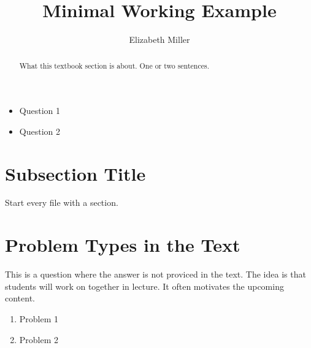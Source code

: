 \documentclass[nooutcomes]{ximera}
\author{Elizabeth Miller}
\title{Minimal Working Example}
\begin{document}
\begin{abstract}
  What this textbook section is about.  One or two sentences.
\end{abstract}
\maketitle



\begin{motivatingQuestions}\begin{itemize}
\item Question 1
\item Question 2
\end{itemize}\end{motivatingQuestions}






\section{Subsection Title}
Start every file with a section.


\section{Problem Types in the Text}

\begin{exploration}
This is a question where the answer is not proviced in the text.  The idea is that students will work on together in lecture.  It often motivates the upcoming content.
	\begin{enumerate}[label=\alph*.]
	\item Problem 1
	\item Problem 2
	\end{enumerate}
\end{exploration}
\end{document}
